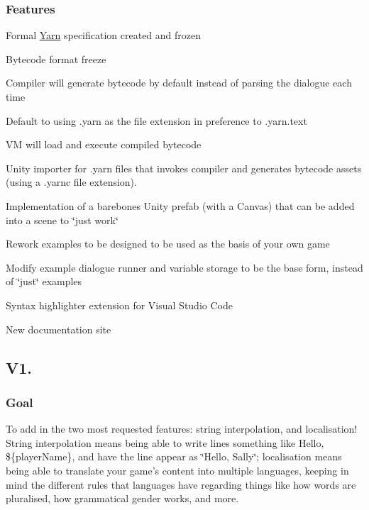 \subsubsection*{Features}


\begin{DoxyItemize}
\item Formal \hyperlink{a00050}{Yarn} specification created and frozen
\item Bytecode format freeze
\item Compiler will generate bytecode by default instead of parsing the dialogue each time
\item Default to using {\ttfamily .yarn} as the file extension in preference to {\ttfamily .yarn.\-text}
\item V\-M will load and execute compiled bytecode
\item Unity importer for {\ttfamily .yarn} files that invokes compiler and generates bytecode assets (using a {\ttfamily .yarnc} file extension).
\item Implementation of a barebones Unity prefab (with a Canvas) that can be added into a scene to \char`\"{}just work\char`\"{}
\item Rework examples to be designed to be used as the basis of your own game
\item Modify example dialogue runner and variable storage to be the base form, instead of \char`\"{}just\char`\"{} examples
\item Syntax highlighter extension for Visual Studio Code
\item New documentation site
\end{DoxyItemize}

\subsection*{V1.}

\subsubsection*{Goal}

To add in the two most requested features\-: string interpolation, and localisation! String interpolation means being able to write lines something like {\ttfamily Hello, \$\{player\-Name\}}, and have the line appear as \char`\"{}\-Hello, Sally\char`\"{}; localisation means being able to translate your game's content into multiple languages, keeping in mind the different rules that languages have regarding things like how words are pluralised, how grammatical gender works, and more.

